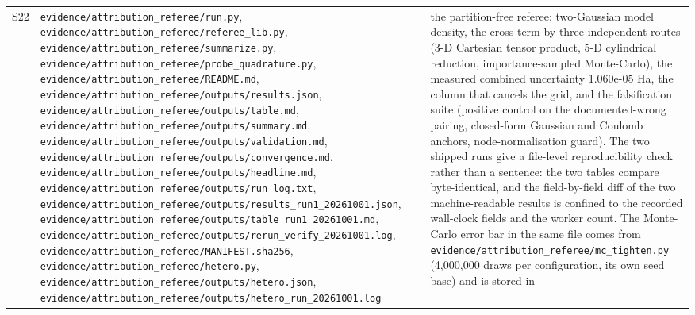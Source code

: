 \documentclass[11pt]{article}
\begin{document}
\begin{longtable}{c>{\raggedright\arraybackslash}p{}>{\raggedright\arraybackslash}p{}}
S22 & \texttt{evidence/\allowbreak{}attribution\_\allowbreak{}referee/\allowbreak{}run.py}, \texttt{evidence/\allowbreak{}attribution\_\allowbreak{}referee/\allowbreak{}referee\_\allowbreak{}lib.py}, \texttt{evidence/\allowbreak{}attribution\_\allowbreak{}referee/\allowbreak{}summarize.py}, \texttt{evidence/\allowbreak{}attribution\_\allowbreak{}referee/\allowbreak{}probe\_\allowbreak{}quadrature.py}, \texttt{evidence/\allowbreak{}attribution\_\allowbreak{}referee/\allowbreak{}README.md}, \texttt{evidence/\allowbreak{}attribution\_\allowbreak{}referee/\allowbreak{}outputs/\allowbreak{}results.json}, \texttt{evidence/\allowbreak{}attribution\_\allowbreak{}referee/\allowbreak{}outputs/\allowbreak{}table.md}, \texttt{evidence/\allowbreak{}attribution\_\allowbreak{}referee/\allowbreak{}outputs/\allowbreak{}summary.md}, \texttt{evidence/\allowbreak{}attribution\_\allowbreak{}referee/\allowbreak{}outputs/\allowbreak{}validation.md}, \texttt{evidence/\allowbreak{}attribution\_\allowbreak{}referee/\allowbreak{}outputs/\allowbreak{}convergence.md}, \texttt{evidence/\allowbreak{}attribution\_\allowbreak{}referee/\allowbreak{}outputs/\allowbreak{}headline.md}, \texttt{evidence/\allowbreak{}attribution\_\allowbreak{}referee/\allowbreak{}outputs/\allowbreak{}run\_\allowbreak{}log.txt}, \texttt{evidence/\allowbreak{}attribution\_\allowbreak{}referee/\allowbreak{}outputs/\allowbreak{}results\_\allowbreak{}run1\_\allowbreak{}20261001.json}, \texttt{evidence/\allowbreak{}attribution\_\allowbreak{}referee/\allowbreak{}outputs/\allowbreak{}table\_\allowbreak{}run1\_\allowbreak{}20261001.md}, \texttt{evidence/\allowbreak{}attribution\_\allowbreak{}referee/\allowbreak{}outputs/\allowbreak{}rerun\_\allowbreak{}verify\_\allowbreak{}20261001.log}, \texttt{evidence/\allowbreak{}attribution\_\allowbreak{}referee/\allowbreak{}MANIFEST.sha256}, \texttt{evidence/\allowbreak{}attribution\_\allowbreak{}referee/\allowbreak{}hetero.py}, \texttt{evidence/\allowbreak{}attribution\_\allowbreak{}referee/\allowbreak{}outputs/\allowbreak{}hetero.json}, \texttt{evidence/\allowbreak{}attribution\_\allowbreak{}referee/\allowbreak{}outputs/\allowbreak{}hetero\_\allowbreak{}run\_\allowbreak{}20261001.log} & the partition-free referee: two-Gaussian model density, the cross term by three independent routes (3-D Cartesian tensor product, 5-D cylindrical reduction, importance-sampled Monte-Carlo), the measured combined uncertainty 1.060e-05 Ha, the column that cancels the grid, and the falsification suite (positive control on the documented-wrong pairing, closed-form Gaussian and Coulomb anchors, node-normalisation guard). The two shipped runs give a file-level reproducibility check rather than a sentence: the two tables compare byte-identical, and the field-by-field diff of the two machine-readable results is confined to the recorded wall-clock fields and the worker count. The Monte-Carlo error bar in the same file comes from \texttt{evidence/\allowbreak{}attribution\_\allowbreak{}referee/\allowbreak{}mc\_\allowbreak{}tighten.py} (4,000,000 draws per configuration, its own seed base) and is stored in 
\end{longtable}
\end{document}

